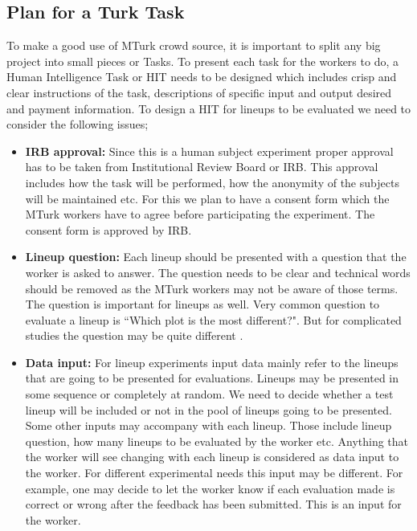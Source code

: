 \documentclass[11pt]{article}
\begin{document}
\subsection{Plan for a Turk Task} \label{sec:task_plan} To make a good use of MTurk crowd source, it is important to split any big project into small pieces or Tasks. To present each task for the workers to do, a Human Intelligence Task or HIT needs to be designed which includes crisp and clear instructions of the task, descriptions of specific input and output desired and payment information. To design a HIT for lineups to be evaluated we need to consider the following issues;

\begin{itemize}

\item {\bf IRB approval:} Since this is a human subject experiment proper approval has to be taken from Institutional Review Board or IRB. This approval includes how the task will be performed, how the anonymity of the subjects will be maintained etc. For this we plan to have a consent form which the MTurk workers have to agree before participating the experiment. The consent form is approved by IRB.
 
\item {\bf Lineup question:} Each lineup should be presented with a question that the worker is asked to answer. The question needs to be clear and technical words should be removed as the MTurk workers may not be aware of those terms. The question is important for lineups as well. Very common question to evaluate a lineup is ``Which plot is the most different?". But for complicated studies the question may be quite different \citep{majumder:socio}.

\item {\bf Data input:} For lineup experiments input data  mainly refer to the lineups that are going to be presented for evaluations. Lineups may be presented in some sequence or completely at random. We need to decide whether a test lineup will be included or not in the pool of lineups going to be presented. Some other inputs may accompany with each lineup. Those include lineup question, how many lineups to be evaluated by the worker etc. Anything that the worker will see changing with each lineup is considered as data input to the worker. For different experimental needs this input may be different. For example, one may decide to let the worker know if each evaluation made is correct or wrong after the feedback has been submitted. This is an input for the worker.


\end{itemize}
\end{document}
